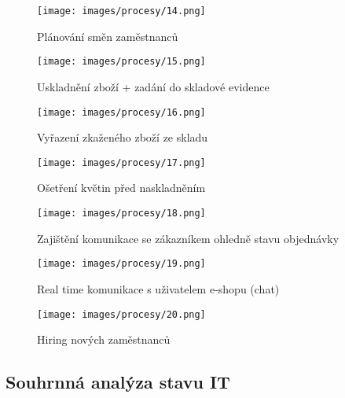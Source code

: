 \documentclass{article}
\begin{document}
\newpage
\begin{figure}[h]
\caption{Plánování směn zaměstnanců}
\texttt{[image: images/procesy/14.png]}
\end{figure}

\newpage
\begin{figure}[h]
\caption{Uskladnění zboží + zadání do skladové evidence}
\texttt{[image: images/procesy/15.png]}
\end{figure}

\newpage
\begin{figure}[h]
\caption{Vyřazení zkaženého zboží ze skladu}
\texttt{[image: images/procesy/16.png]}
\end{figure}

\newpage
\begin{figure}[h]
\caption{Ošetření květin před naskladněním}
\texttt{[image: images/procesy/17.png]}
\end{figure}

\newpage
\begin{figure}[h]
\caption{Zajištění komunikace se zákazníkem ohledně stavu objednávky}
\texttt{[image: images/procesy/18.png]}
\end{figure}

\newpage
\begin{figure}[h]
\centering
\caption{Real time komunikace s uživatelem e-shopu (chat)}
\texttt{[image: images/procesy/19.png]}
\end{figure}

\newpage
\begin{figure}[h]
\caption{Hiring nových zaměstnanců}
\texttt{[image: images/procesy/20.png]}
\end{figure}

\newpage

\subsection*{Souhrnná analýza stavu IT}
\end{document}
